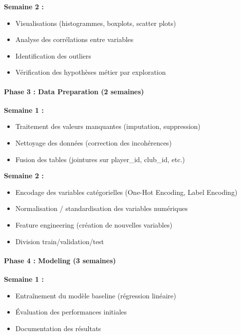 \documentclass[12pt,a4paper]{article}
\begin{document}
\textbf{Semaine 2 :}
\begin{itemize}[leftmargin=*]
    \item Visualisations (histogrammes, boxplots, scatter plots)
    \item Analyse des corrélations entre variables
    \item Identification des outliers
    \item Vérification des hypothèses métier par exploration
\end{itemize}

\paragraph{Phase 3 : Data Preparation (2 semaines)}

\textbf{Semaine 1 :}
\begin{itemize}[leftmargin=*]
    \item Traitement des valeurs manquantes (imputation, suppression)
    \item Nettoyage des données (correction des incohérences)
    \item Fusion des tables (jointures sur player\_id, club\_id, etc.)
\end{itemize}

\textbf{Semaine 2 :}
\begin{itemize}[leftmargin=*]
    \item Encodage des variables catégorielles (One-Hot Encoding, Label Encoding)
    \item Normalisation / standardisation des variables numériques
    \item Feature engineering (création de nouvelles variables)
    \item Division train/validation/test
\end{itemize}

\paragraph{Phase 4 : Modeling (3 semaines)}

\textbf{Semaine 1 :}
\begin{itemize}[leftmargin=*]
    \item Entraînement du modèle baseline (régression linéaire)
    \item Évaluation des performances initiales
    \item Documentation des résultats
\end{itemize}
\end{document}
